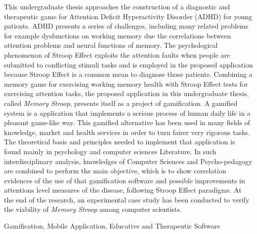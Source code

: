 This undergraduate thesis approaches the construction of a diagnostic and therapeutic game for Attention Deficit Hyperactivity Disorder (ADHD) for young patients. ADHD presents a series of challenges, including many related problems for example dysfunctions on working memory due the correlations between attention problems and neural functions of memory. The psychological phenomenon of Stroop Effect exploits the attention faults when people are submitted to conflicting stimuli tasks and is employed in the proposed application because Stroop Effect is a common mean to diagnose those patients. Combining a memory game for exercising working memory health with Stroop Effect tests for exercising attention tasks, the proposed application in this undergraduate thesis, called \textit{Memory Stroop}, presents itself as a project of gamification. A gamified system is a application that implements a serious process of human daily life in a pleasant game-like way. This gamified alternative has been used in many fields of knowledge, market and health services in order to turn fairer very rigorous tasks. The theoretical basis and principles needed to implement that application is found mainly in psychology and computer sciences Literature. In such interdisciplinary analysis, knowledges of Computer Sciences and Psycho-pedagogy are combined to perform the main objective, which is to show correlation evidences of the use of that gamification software and possible improvements in attentions level measures of the disease, following Stroop Effect paradigms. At the end of the research, an experimental case study has been conducted to verify the viability of \textit{Memory Stroop} among computer scientists.



\begin{keywords}
Gamification, Mobile Application, Educative and Therapeutic Software
\end{keywords}